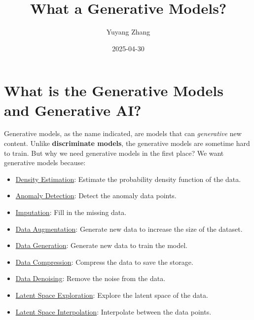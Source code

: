 \documentclass[
  12pt,
]{article}
\title{\textbf{What a Generative Models?}}
\author{Yuyang Zhang}
\date{2025-04-30}
\providecommand{\tightlist}{%
  \setlength{\itemsep}{0pt}\setlength{\parskip}{0pt}}\usepackage{longtable,booktabs,array}
\renewcommand*\contentsname{Table of contents}
\newcommand\contentsname{Table of contents}
\theoremstyle{plain}
\theoremstyle{remark}
\begin{document}
\maketitle

\renewcommand*\contentsname{Contents}
{
\hypersetup{linkcolor=}
\setcounter{tocdepth}{2}
\tableofcontents
}

\section{What is the Generative Models and Generative
AI?}\label{what-is-the-generative-models-and-generative-ai}

Generative models, as the name indicated, are models that can
\emph{generative} new content. Unlike \textbf{discriminate models}, the
generative models are sometime hard to train. But why we need generative
models in the first place? We want generative models because:

\begin{itemize}
\tightlist
\item
  \href{https://en.wikipedia.org/wiki/Density_estimation}{Density
  Estimation}: Estimate the probability density function of the data.
\item
  \href{https://en.wikipedia.org/wiki/Anomaly_detection}{Anomaly
  Detection}: Detect the anomaly data points.
\item
  \href{https://en.wikipedia.org/wiki/Imputation}{Imputation}: Fill in
  the missing data.
\item
  \href{https://en.wikipedia.org/wiki/Data_augmentation}{Data
  Augmentation}: Generate new data to increase the size of the dataset.
\item
  \href{https://en.wikipedia.org/wiki/Data_generation}{Data Generation}:
  Generate new data to train the model.
\item
  \href{https://en.wikipedia.org/wiki/Data_compression}{Data
  Compression}: Compress the data to save the storage.
\item
  \href{https://en.wikipedia.org/wiki/Denoising}{Data Denoising}: Remove
  the noise from the data.
\item
  \href{https://en.wikipedia.org/wiki/Latent_space}{Latent Space
  Exploration}: Explore the latent space of the data.
\item
  \href{https://en.wikipedia.org/wiki/Interpolation}{Latent Space
  Interpolation}: Interpolate between the data points.
\end{itemize}
\end{document}
